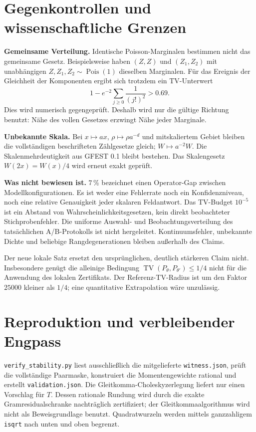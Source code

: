 \documentclass[11pt,a4paper]{article}
\newcommand{\TV}{\operatorname{TV}}\newcommand{\Pois}{\operatorname{Pois}}
\begin{document}
\section{Gegenkontrollen und wissenschaftliche Grenzen}
\textbf{Gemeinsame Verteilung.} Identische Poisson-Marginalen bestimmen nicht das gemeinsame Gesetz. Beispielsweise haben $(Z,Z)$ und $(Z_1,Z_2)$ mit unabhängigen $Z,Z_1,Z_2\sim\Pois(1)$ dieselben Marginalen. Für das Ereignis der Gleichheit der Komponenten ergibt sich trotzdem ein TV-Unterwert
\[
 1-e^{-2}\sum_{j\geq0}\frac{1}{(j!)^2}>0.69.
\]
Dies wird numerisch gegengeprüft. Deshalb wird nur die gültige Richtung benutzt: Nähe des vollen Gesetzes erzwingt Nähe jeder Marginale.

\textbf{Unbekannte Skala.} Bei $x\mapsto ax$, $\rho\mapsto\rho a^{-d}$ und mitskaliertem Gebiet bleiben die vollständigen beschrifteten Zählgesetze gleich; $W\mapsto a^{-2}W$. Die Skalenmehrdeutigkeit aus GFEST 0.1 bleibt bestehen. Das Skalengesetz $W(2x)=W(x)/4$ wird erneut exakt geprüft.

\textbf{Was nicht bewiesen ist.} $7\,\%$ bezeichnet einen Operator-Gap zwischen Modellkonfigurationen. Es ist weder eine Fehlerrate noch ein Konfidenzniveau, noch eine relative Genauigkeit jeder skalaren Feldantwort. Das TV-Budget $10^{-5}$ ist ein Abstand von Wahrscheinlichkeitsgesetzen, kein direkt beobachteter Stichprobenfehler. Die uniforme Auswahl- und Beobachtungsverteilung des tatsächlichen A/B-Protokolls ist nicht hergeleitet. Kontinuumsfehler, unbekannte Dichte und beliebige Rangdegenerationen bleiben außerhalb des Claims.

Der neue lokale Satz ersetzt den ursprünglichen, deutlich stärkeren Claim nicht. Insbesondere genügt die alleinige Bedingung $\TV(P_\theta,P_{\theta'})\leq1/4$ nicht für die Anwendung des lokalen Zertifikats. Der Referenz-TV-Radius ist um den Faktor $25000$ kleiner als $1/4$; eine quantitative Extrapolation wäre unzulässig.

\section{Reproduktion und verbleibender Engpass}
\texttt{verify\_stability.py} liest ausschließlich die mitgelieferte \texttt{witness.json}, prüft die vollständige Paarmaske, konstruiert die Momentengewichte rational und erstellt \texttt{validation.json}. Die Gleitkomma-Choleskyzerlegung liefert nur einen Vorschlag für $T$. Dessen rationale Rundung wird durch die exakte Gramresidualschranke nachträglich zertifiziert; der Gleitkommaalgorithmus wird nicht als Beweisgrundlage benutzt. Quadratwurzeln werden mittels ganzzahligem \texttt{isqrt} nach unten und oben begrenzt.
\end{document}

